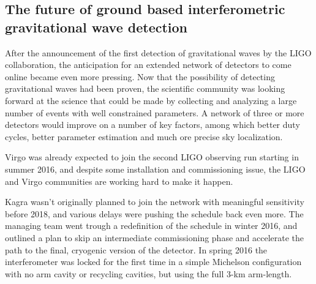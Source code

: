 \subsection{The future of ground based interferometric gravitational wave detection}\label{subsec:future}

After the announcement of the first detection of gravitational waves by the LIGO collaboration, the anticipation for an extended network of detectors to come online became even more pressing. Now that the possibility of detecting gravitational waves had been proven, the scientific community was looking forward at the science that could be made by collecting and analyzing a large number of events with well constrained parameters. A network of three or more detectors would improve on a number of key factors, among which better duty cycles, better parameter estimation and much ore precise sky localization.

Virgo was already expected to join the second LIGO observing run starting in summer 2016, and despite some installation and commissioning issue, the LIGO and Virgo communities are working hard to make it happen.

Kagra wasn't originally planned to join the network with meaningful sensitivity before 2018, and various delays were pushing the schedule back even more. The managing team went trough a redefinition of the schedule in winter 2016, and outlined a plan to skip an intermediate commissioning phase and accelerate the path to the final, cryogenic version of the detector. In spring 2016 the interferometer was locked for the first time in a simple Michelson configuration with no arm cavity or recycling cavities, but using the full 3-km arm-length.

